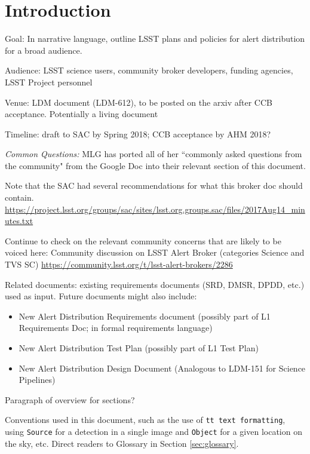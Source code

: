 \section{Introduction}\label{sec:introduction}

Goal: In narrative language, outline LSST plans and policies for alert distribution for a broad audience.

Audience: LSST science users, community broker developers, funding agencies, LSST Project personnel

Venue:  LDM document (LDM-612), to be posted on the arxiv after CCB acceptance. Potentially a living document

Timeline: draft to SAC by Spring 2018; CCB acceptance by AHM 2018?

{\it Common Questions:} MLG has ported all of her ``commonly asked questions from the community" from the Google Doc into their relevant section of this document.

Note that the SAC had several recommendations for what this broker doc should contain.
\url{https://project.lsst.org/groups/sac/sites/lsst.org.groups.sac/files/2017Aug14_minutes.txt}

Continue to check on the relevant community concerns that are likely to be voiced here:
Community discussion on LSST Alert Broker (categories Science and TVS SC)
\url{https://community.lsst.org/t/lsst-alert-brokers/2286}

Related documents: existing requirements documents (SRD, DMSR, DPDD, etc.) used as input. Future documents might also include:
\begin{itemize}
\item{New Alert Distribution Requirements document (possibly part of L1 Requirements Doc; in formal requirements language)}
\item{New Alert Distribution Test Plan (possibly part of L1 Test Plan)}
\item{New Alert Distribution Design Document (Analogous to LDM-151 for Science Pipelines)}
\end{itemize}

Paragraph of overview for sections?

Conventions used in this document, such as the use of {\tt tt text formatting}, using {\tt Source} for a detection in a single image and {\tt Object} for a given location on the sky, etc. Direct readers to Glossary in Section \ref{sec:glossary}.